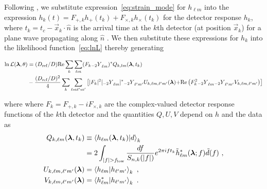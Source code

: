 \documentclass[twocolumn,prd,nofootinbib]{revtex4}
\newcommand\qmstateproduct[2]{\left\langle#1|#2\right\rangle}
\newcommand\Y[1]{{{}_{#1}Y}}
\begin{document}
Following \citet{gwastro-PE-AlternativeArchitectures}, we substitute expression~\eqref{eq:strain_mode} 
for $h_{\ell m}$ into the expression $h_k(t) =F_{+,k} h_+(t_k) +
  F_{\times,k}h_\times(t_k)$ for the detector response $h_k$, 
where $t_k=t_c - \vec{x}_k \cdot \hat{n}$ is the arrival time at the $k$th detector (at position $\vec{x}_k$)
for a plane wave propagating along $\hat{n}$ \cite{gwastro-PE-AlternativeArchitectures}.
We then substitute these expressions for $h_k$ into the likelihood function~\eqref{eq:lnL}
thereby generating~\cite{gwastro-PE-AlternativeArchitectures}
\begin{widetext}
\begin{align}
\ln {\cal L}(\bm{\lambda}, \theta) 
&= (D_{\rm ref}/D) \text{Re} \sum_k \sum_{\ell m}(F_k \Y{-2}_{\ell m})^* Q_{k,lm}(\bm{\lambda},t_k)\nonumber \\
&   -\frac{(D_{\rm ref}/D)^2}{4}\sum_k \sum_{\ell m \ell' m'}
\left[
{
|F_k|^2 [\Y{-2}_{\ell m}]^*\Y{-2}_{\ell'm'} U_{k,\ell m,\ell' m'}(\bm{\lambda})
}
 {
+  \text{Re} \left( F_k^2 \Y{-2}_{\ell m} \Y{-2}_{\ell'm'} V_{k,\ell m,\ell'm'} \right)
}
\right]
\label{eq:def:lnL:Decomposed}
\end{align}
\end{widetext}
where 
 where $F_k = F_{+,k} - i F_{\times,k}$ are the
complex-valued detector
response functions of the $k$th detector \cite{gwastro-PE-AlternativeArchitectures} and 
the quantities $Q,U,V$ depend on $h$ and the data as
\begin{subequations}
\label{eq:QUV}
\begin{align}
Q_{k,\ell m}(\bm{\lambda},t_k) &\equiv \qmstateproduct{h_{\ell m}(\bm{\lambda},t_k)}{d}_k \nonumber\\
&= 2 \int_{|f|>f_{\rm low}} \frac{df}{S_{n,k}(|f|)} e^{2\pi i f t_k} \tilde{h}_{\ell m}^*(\bm{\lambda};f) \tilde{d}(f)\ , \\
{ U_{k,\ell m,\ell' m'}(\bm{\lambda})}& = \qmstateproduct{h_{\ell m}}{h_{\ell'm'}}_k\ , \\
V_{k,\ell m,\ell' m'}(\bm{\lambda})& = \qmstateproduct{h_{\ell m}^*}{h_{\ell'm'}}_k  \ .
\end{align}
\end{subequations}
\end{document}
